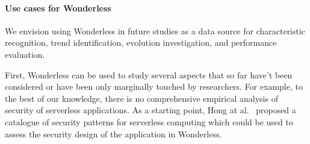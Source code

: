 \paragraph{Use cases for Wonderless}
We envision using Wonderless in future studies as a data source for characteristic recognition, 
trend identification, evolution investigation, and performance evaluation.

First, Wonderless can be used to study several aspects that so far have't
been considered or have been only marginally touched by researchers.
For example, to the best of our knowledge, there is no comprehensive 
empirical analysis of security of serverless applications. 
As a starting point, Hong at al.~\cite{216833} proposed a catalogue of
security patterns for serverless computing which could be used to assess
the security design of the application in  Wonderless.


